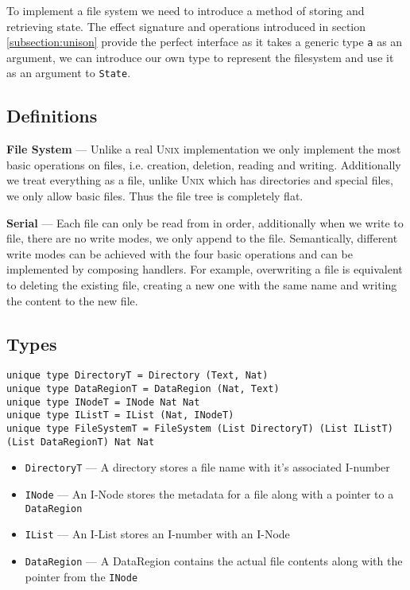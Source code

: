 \documentclass[logo,bsc,singlespacing,parskip]{infthesis}
\begin{document}
To implement a file system we need to introduce a method of storing and
retrieving state. The effect signature and operations introduced in section
\ref{subsection:unison} provide the perfect interface as it takes a generic
type \texttt{a} as an argument, we can introduce our own type to represent the
filesystem and use it as an argument to \texttt{State}.

\subsection{Definitions}

\textbf{File System} ---
Unlike a real \textsc{Unix} implementation we only implement the most basic
operations on files, i.e. creation, deletion, reading and writing. Additionally
we treat everything as a file, unlike \textsc{Unix} which has directories and
special files, we only allow basic files. Thus the file tree is completely flat.

\textbf{Serial} --- Each file can only be read from in order, additionally when
we write to file, there are no write modes, we only append to the file.
Semantically, different write modes can be achieved with the four basic
operations and can be implemented by composing handlers. For example,
overwriting a file is equivalent to deleting the existing file, creating a new
one with the same name and writing the content to the new file.

\subsection{Types}
\label{sec:filesystemtypes}

\begin{lstlisting}[language=unison]
unique type DirectoryT = Directory (Text, Nat)
unique type DataRegionT = DataRegion (Nat, Text)
unique type INodeT = INode Nat Nat
unique type IListT = IList (Nat, INodeT)
unique type FileSystemT = FileSystem (List DirectoryT) (List IListT) (List DataRegionT) Nat Nat
\end{lstlisting}

\begin{itemize}
  \item{\texttt{DirectoryT} --- A directory stores a file name with it's associated I-number}
  \item{\texttt{INode} --- An I-Node stores the metadata for a file along with a pointer to a \texttt{DataRegion}}
  \item{\texttt{IList} --- An I-List stores an I-number with an I-Node}
  \item{\texttt{DataRegion} --- A DataRegion contains the actual file contents along with the pointer from the \texttt{INode}}
\end{itemize}
\end{document}
